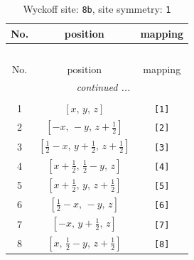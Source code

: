 \documentclass[fleqn,8pt]{jsarticle}
\begin{document}
\begin{longtable}{ccc}
\caption{Wyckoff site: {\tt 8b}, site symmetry: {\tt 1}}
 \\
 \hline \hline
No. & position & mapping \\ \hline \endfirsthead

\multicolumn{2}{l}{\tablename\ \thetable{}} \\
 \hline \hline
No. & position & mapping \\ \hline \endhead

 \hline \hline
\multicolumn{2}{r}{\footnotesize\it continued ...} \\ \endfoot

 \hline \hline
\multicolumn{2}{r}{} \\ \endlastfoot

1 & $\left[ x,\, y,\, z \right]$ & {\tt [1]} \\ \hline
2 & $\left[ - x,\, - y,\, z + \frac{1}{2} \right]$ & {\tt [2]} \\ \hline
3 & $\left[ \frac{1}{2} - x,\, y + \frac{1}{2},\, z + \frac{1}{2} \right]$ & {\tt [3]} \\ \hline
4 & $\left[ x + \frac{1}{2},\, \frac{1}{2} - y,\, z \right]$ & {\tt [4]} \\ \hline
5 & $\left[ x + \frac{1}{2},\, y,\, z + \frac{1}{2} \right]$ & {\tt [5]} \\ \hline
6 & $\left[ \frac{1}{2} - x,\, - y,\, z \right]$ & {\tt [6]} \\ \hline
7 & $\left[ - x,\, y + \frac{1}{2},\, z \right]$ & {\tt [7]} \\ \hline
8 & $\left[ x,\, \frac{1}{2} - y,\, z + \frac{1}{2} \right]$ & {\tt [8]} \\
\end{longtable}
\end{document}
